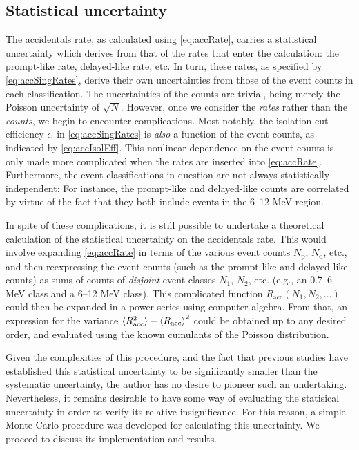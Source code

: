 \documentclass[../thesis.tex]{subfiles}
\begin{document}
\subsection{Statistical uncertainty}
\label{sec:accStatUnc}

The accidentals rate, as calculated using \autoref{eq:accRate}, carries a statistical uncertainty which derives from that of the rates that enter the calculation: the prompt-like rate, delayed-like rate, etc. In turn, these rates, as specified by \autoref{eq:accSingRates}, derive their own uncertainties from those of the event counts in each classification. The uncertainties of the counts are trivial, being merely the Poisson uncertainty of $\sqrt{N}$. However, once we consider the \emph{rates} rather than the \emph{counts}, we begin to encounter complications. Most notably, the isolation cut efficiency $\epsilon_{\mathrm{i}}$ in \autoref{eq:accSingRates} is \emph{also} a function of the event counts, as indicated by \autoref{eq:accIsolEff}. This nonlinear dependence on the event counts is only made more complicated when the rates are inserted into \autoref{eq:accRate}. Furthermore, the event classifications in question are not always statistically independent: For instance, the prompt-like and delayed-like counts are correlated by virtue of the fact that they both include events in the 6--12 MeV region.

In spite of these complications, it is still possible to undertake a theoretical calculation of the statistical uncertainty on the accidentals rate. This would involve expanding \autoref{eq:accRate} in terms of the various event counts $N_{\mathrm{p}}$, $N_{\mathrm{d}}$, etc., and then reexpressing the event counts (such as the prompt-like and delayed-like counts) as sums of counts of \emph{disjoint} event classes $N_1$, $N_2$, etc. (e.g., an 0.7--6 MeV class and a 6--12 MeV class). This complicated function $R_{\mathrm{acc}}(N_1, N_2, \ldots)$ could then be expanded in a power series using computer algebra. From that, an expression for the variance $\braket{R_{\mathrm{acc}}^2} - \braket{R_{\mathrm{acc}}}^2$ could be obtained up to any desired order, and evaluated using the known cumulants of the Poisson distribution.

Given the complexities of this procedure, and the fact that previous studies have established this statistical uncertainty to be significantly smaller than the systematic uncertainty, the author has no desire to pioneer such an undertaking. Nevertheless, it remains desirable to have some way of evaluating the statisical uncertainty in order to verify its relative insignificance.
For this reason, a simple Monte Carlo procedure was developed for calculating this uncertainty. We proceed to discuss its implementation and results.
\end{document}

